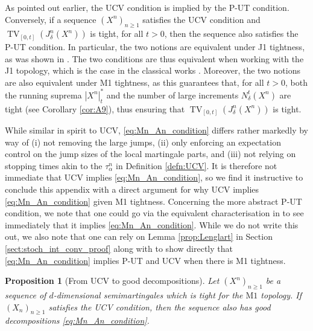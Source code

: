 \documentclass[11pt]{article}
\newtheorem{prop}[theorem]{Proposition}
\theoremstyle{definition}\newtheorem{example}[theorem]{Example}
\theoremstyle{definition}\newtheorem{counterexample}[theorem]{Counterexample}
\theoremstyle{definition}\newtheorem{remark}[theorem]{Remark}
\theoremstyle{definition}\newtheorem{defi}[theorem]{Definition}
\numberwithin{equation}{section}
\renewcommand{\|}{\; : \, \;}											%
\begin{document}
As pointed out earlier, the UCV condition is implied by the P-UT condition. Conversely, if a sequence $(X^n)_{n\ge 1}$ satisfies the UCV condition and $\operatorname{TV}_{[0,t]}(J_\delta^n(X^n))$ is tight, for all $t> 0$, then the sequence also satisfies the P-UT condition. In particular, the two notions are equivalent under J1 tightness, as was shown in \cite{kurtzprotter}. The two conditions are thus equivalent when working with the J1 topology, which is the case in the classical works \cite{shiryaev,jakubowskimeminpages,kurtzprotter,graham,meminslominski}. Moreover, the two notions are also equivalent under M1 tightness, as this guarantees that, for all $t>0$, both the running suprema $|X^n|_t^*$ and the number of large increments $N^t_\delta(X^n)$ are tight (see Corollary \ref{cor:A9}), thus ensuring that $\operatorname{TV}_{[0,t]}(J_\delta^n(X^n))$ is tight.




While similar in spirit to UCV, \eqref{eq:Mn_An_condition} differs rather markedly by way of (i) not removing the large jumps, (ii) only enforcing an expectation control on the jump sizes of the local martingale parts, and (iii) not relying on stopping times akin to the $\tau^n_\alpha$ in Definition \ref{defn:UCV}. It is therefore not immediate that UCV implies \eqref{eq:Mn_An_condition}, so we find it instructive to conclude this appendix with a direct argument for why UCV implies \eqref{eq:Mn_An_condition} given M1 tightness. Concerning the more abstract P-UT condition, we note that one could go via the equivalent characterisation in \cite[Thm.~VI.6.15] {shiryaev} to see immediately that it implies \eqref{eq:Mn_An_condition}. While we do not write this out, we also note that one can rely on Lemma \ref{prop:Lenglart} in Section \ref{sect:stoch_int_conv_proof} along with \cite[Prop.~VI.6.13(ii)]{shiryaev} to show directly that \eqref{eq:Mn_An_condition} implies P-UT and UCV when there is M1 tightness.


\begin{prop}[From UCV to good decompositions]\label{prop:P-UT_and_UCV}
	Let $(X^n)_{n\ge 1}$ be a sequence of $d$-dimensional semimartingales which is tight for the $\text{M1}$ topology. If $(X_n)_{n\geq 1}$ satisfies the UCV condition, then the sequence also has good decompositions \eqref{eq:Mn_An_condition}.
\end{prop}
\end{document}
